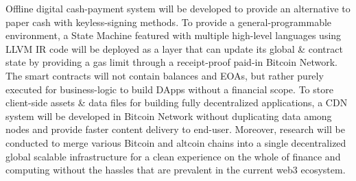 \documentclass[a4paper, 10pt]{extarticle}
\begin{document}
Offline digital cash-payment system will be developed to provide an alternative to paper cash with keyless-signing methods. To provide a general-programmable environment, a State Machine \cite{wood2014ethereum} featured with multiple high-level languages using LLVM \cite{llvm} IR code will be deployed as a layer that can update its global \& contract state by providing a gas limit through a receipt-proof paid-in Bitcoin Network. The smart contracts will not contain balances and EOAs, but rather purely executed for business-logic to build DApps without a financial scope. To store client-side assets \& data files for building fully decentralized applications, a CDN system will be developed in Bitcoin Network without duplicating data among nodes and provide faster content delivery to end-user. Moreover, research will be conducted to merge various Bitcoin and altcoin chains into a single decentralized global scalable infrastructure for a clean experience on the whole of finance and computing without the hassles that are prevalent in the current web3 ecosystem.


\end{document}
